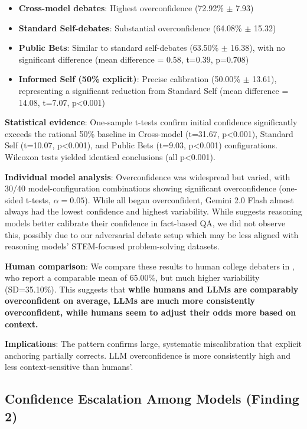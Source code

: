 \documentclass{article}
\begin{document}
\begin{itemize}
    \item \textbf{Cross-model debates}: Highest overconfidence (72.92\% $\pm$ 7.93)
    \item \textbf{Standard Self-debates}: Substantial overconfidence (64.08\% $\pm$ 15.32)
    \item \textbf{Public Bets}: Similar to standard self-debates (63.50\% $\pm$ 16.38), with no significant difference (mean difference = 0.58, t=0.39, p=0.708)
    \item \textbf{Informed Self (50\% explicit)}: Precise calibration (50.00\% $\pm$ 13.61), representing a significant reduction from Standard Self (mean difference = 14.08, t=7.07, p<0.001)
\end{itemize}

\textbf{Statistical evidence}: One-sample t-tests confirm initial confidence significantly exceeds the rational 50\% baseline in Cross-model (t=31.67, p<0.001), Standard Self (t=10.07, p<0.001), and Public Bets (t=9.03, p<0.001) configurations. Wilcoxon tests yielded identical conclusions (all p<0.001).

\textbf{Individual model analysis}: Overconfidence was widespread but varied, with 30/40 model-configuration combinations showing significant overconfidence (one-sided t-tests, $\alpha=0.05$). While all began overconfident, Gemini 2.0 Flash almost always had the lowest confidence and highest variability. While \citet{yoon2025reasoningmodelsbetterexpress} suggests reasoning models better calibrate their confidence in fact-based QA, we did not observe this, possibly due to our adversarial debate setup which may be less aligned with reasoning models' STEM-focused problem-solving datasets.

\textbf{Human comparison}: We compare these results to human college debaters in \citet{RePEc:sip:dpaper:06-042}, who report a comparable mean of 65.00\%, but much higher variability (SD=35.10\%). This suggests that \textbf{while humans and LLMs are comparably overconfident on average, LLMs are much more consistently overconfident, while humans seem to adjust their odds more based on context.}

\textbf{Implications}: The pattern confirms large, systematic miscalibration that explicit anchoring partially corrects. LLM overconfidence is more consistently high and less context-sensitive than humans'.

\subsection{Confidence Escalation Among Models (Finding 2)}
\label{subsec:confidence_escalation}
\end{document}
